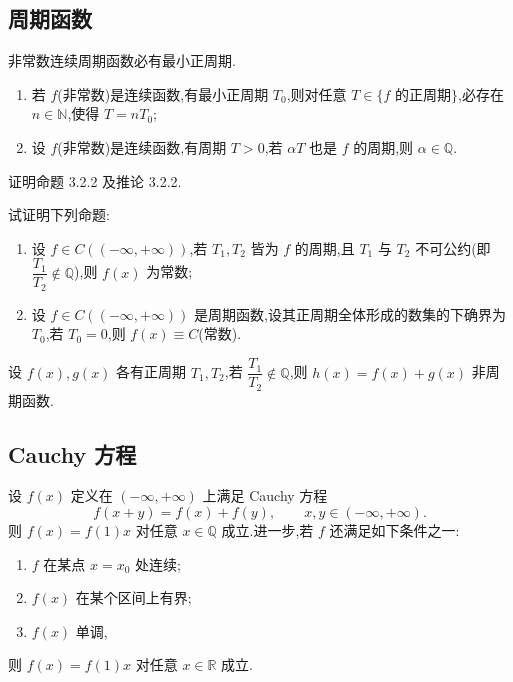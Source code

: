 \documentclass[../数学分析培优讲义.tex]{subfiles}
\begin{document}
\newpage

\subsection{周期函数}

\begin{proposition}[\markstar]
非常数连续周期函数必有最小正周期.
\end{proposition}

\begin{corollary}[\markstar]
\begin{enumerate}[label=(\arabic*)]
    \item 若 $f$(非常数)是连续函数,有最小正周期 $T_0$,则对任意 $T\in\{f\text{ 的正周期}\}$,必存在 $n\in\mathbb{N}$,使得 $T=nT_0$;
    \item 设 $f$(非常数)是连续函数,有周期 $T>0$,若 $\alpha T$ 也是 $f$ 的周期,则 $\alpha\in\mathbb{Q}$.
\end{enumerate}
\end{corollary}

\begin{example}
证明命题 3.2.2 及推论 3.2.2.
\end{example}
\exampleblank

\begin{example}
试证明下列命题:
\begin{enumerate}[label=(\arabic*)]
    \item 设 $f\in C(( -\infty,+\infty))$,若 $T_1,T_2$ 皆为 $f$ 的周期,且 $T_1$ 与 $T_2$ 不可公约(即 $\dfrac{T_1}{T_2}\notin\mathbb{Q}$),则 $f(x)$ 为常数;
    \item 设 $f\in C(( -\infty,+\infty))$ 是周期函数,设其正周期全体形成的数集的下确界为 $T_0$,若 $T_0=0$,则 $f(x)\equiv C$(常数).
\end{enumerate}
\end{example}
\exampleblank

\begin{example}
设 $f(x),g(x)$ 各有正周期 $T_1,T_2$,若 $\dfrac{T_1}{T_2}\notin\mathbb{Q}$,则 $h(x)=f(x)+g(x)$ 非周期函数.
\end{example}
\exampleblank


\newpage

\subsection{Cauchy 方程}

\begin{proposition}[\markstar]
设 $f(x)$ 定义在 $(-\infty,+\infty)$ 上满足 Cauchy 方程
\[
    f(x+y)=f(x)+f(y),
    \qquad x,y\in(-\infty,+\infty).
\]
则 $f(x)=f(1)x$ 对任意 $x\in\mathbb{Q}$ 成立.进一步,若 $f$ 还满足如下条件之一:
\begin{enumerate}[label=(\arabic*)]
    \item $f$ 在某点 $x=x_0$ 处连续;
    \item $f(x)$ 在某个区间上有界;
    \item $f(x)$ 单调,
\end{enumerate}
则 $f(x)=f(1)x$ 对任意 $x\in\mathbb{R}$ 成立.
\end{proposition}
\end{document}
